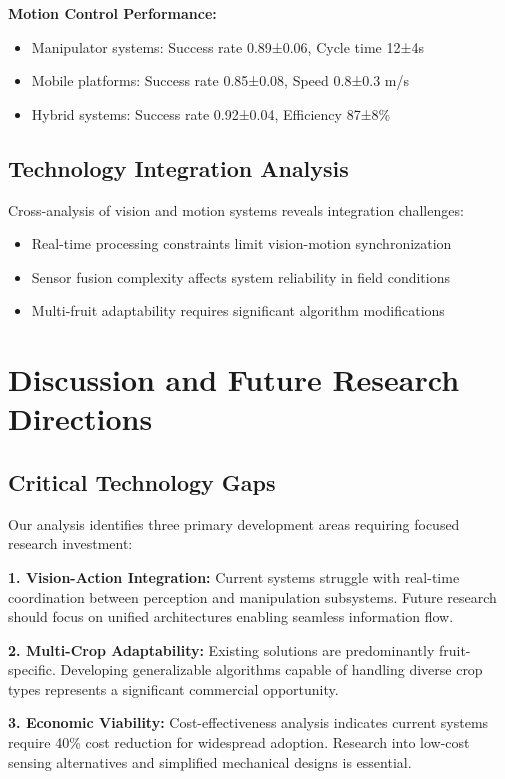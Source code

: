 \documentclass{ieeeaccess}
\begin{document}
\textbf{Motion Control Performance:}
\begin{itemize}
\item Manipulator systems: Success rate 0.89±0.06, Cycle time 12±4s
\item Mobile platforms: Success rate 0.85±0.08, Speed 0.8±0.3 m/s  
\item Hybrid systems: Success rate 0.92±0.04, Efficiency 87±8\%
\end{itemize}

\subsection{Technology Integration Analysis}

Cross-analysis of vision and motion systems reveals integration challenges:
\begin{itemize}
\item Real-time processing constraints limit vision-motion synchronization
\item Sensor fusion complexity affects system reliability in field conditions
\item Multi-fruit adaptability requires significant algorithm modifications
\end{itemize}

\section{Discussion and Future Research Directions}
\label{sec:discussion}

\subsection{Critical Technology Gaps}

Our analysis identifies three primary development areas requiring focused research investment:

\textbf{1. Vision-Action Integration:} Current systems struggle with real-time coordination between perception and manipulation subsystems. Future research should focus on unified architectures enabling seamless information flow.

\textbf{2. Multi-Crop Adaptability:} Existing solutions are predominantly fruit-specific. Developing generalizable algorithms capable of handling diverse crop types represents a significant commercial opportunity.

\textbf{3. Economic Viability:} Cost-effectiveness analysis indicates current systems require 40\% cost reduction for widespread adoption. Research into low-cost sensing alternatives and simplified mechanical designs is essential.
\end{document}
